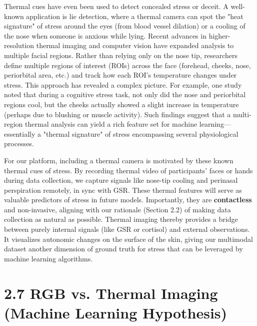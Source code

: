 Thermal cues have even been used to detect concealed stress or deceit. A well-known application is lie detection, where a thermal camera can spot the "heat signature" of stress around the eyes (from blood vessel dilation) or a cooling of the nose when someone is anxious while lying. Recent advances in higher-resolution thermal imaging and computer vision have expanded analysis to multiple facial regions. Rather than relying only on the nose tip, researchers define multiple regions of interest (ROIs) across the face (forehead, cheeks, nose, periorbital area, etc.) and track how each ROI's temperature changes under stress\cite{ContactlessStressThermal2022}. This approach has revealed a complex picture. For example, one study noted that during a cognitive stress task, not only did the nose and periorbital regions cool, but the cheeks actually showed a slight increase in temperature (perhaps due to blushing or muscle activity)\cite{ContactlessStressThermal2022}. Such findings suggest that a multi-region thermal analysis can yield a rich feature set for machine learning—essentially a "thermal signature" of stress encompassing several physiological processes.

For our platform, including a thermal camera is motivated by these known thermal cues of stress. By recording thermal video of participants' faces or hands during data collection, we capture signals like nose-tip cooling and perinasal perspiration remotely, in sync with GSR. These thermal features will serve as valuable predictors of stress in future models. Importantly, they are \textbf{contactless} and non-invasive, aligning with our rationale (Section 2.2) of making data collection as natural as possible. Thermal imaging thereby provides a bridge between purely internal signals (like GSR or cortisol) and external observations. It visualizes autonomic changes on the surface of the skin, giving our multimodal dataset another dimension of ground truth for stress that can be leveraged by machine learning algorithms.

\section{2.7 RGB vs. Thermal Imaging (Machine Learning Hypothesis)}


